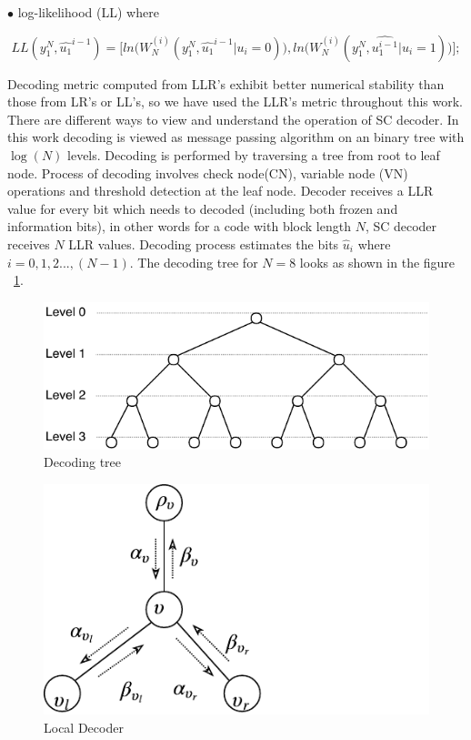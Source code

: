 $\bullet$ log-likelihood (LL) where 

\begin{equation}
LL(y_{1}^{N},\hat{u_{1}}^{i-1}) = \Big[ln\Big(W_{N}^{(i)}(y_{1}^{N},\hat{u_{1}}^{i-1}|u_{i} = 0)\Big), ln\Big(W_{N}^{(i)}(y_{1}^{N},\hat{u_{1}^{i-1}}|u_{i} = 1)\Big)\Big];
\end{equation}


Decoding metric computed from LLR's exhibit better numerical stability than those from LR's or LL's, so we have used the LLR's metric throughout this work. There are different ways to view and understand the operation of SC decoder. In this work decoding is viewed as message passing algorithm on an binary tree with $\log(N)$ levels. Decoding is performed by traversing a tree from root to leaf node. Process of decoding involves check node(CN), variable node (VN) operations and threshold detection at the leaf node. Decoder receives a LLR value for every bit which needs to decoded (including both frozen and information bits), in other words for a code with block length $N$, SC decoder receives $N$ LLR values. Decoding process estimates the bits $\hat{u}_{i} $  where $i = 0,1,2...,(N-1)$. The decoding tree for $N = 8$ looks as shown in the figure ~\ref{fig:decodingTree}.

\begin{figure}[h]
	\centering
	\includegraphics{./figures/decodingTree.pdf}
	\caption{Decoding tree}
	\label{fig:decodingTree}
\end{figure}

\begin{figure}[h]
	\centering
	\includegraphics{./figures/messagePassingDiaS.pdf}
	\caption{Local Decoder}
	\label{fig:msgPassingDia}
\end{figure}

